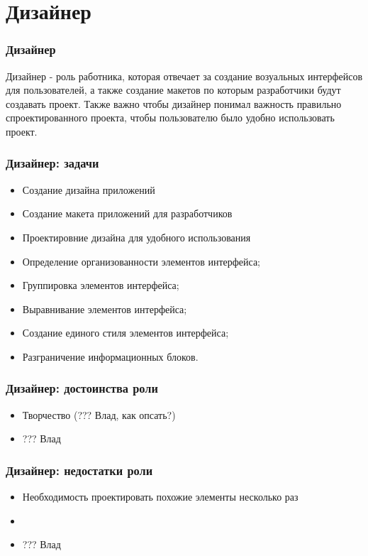 \documentclass{../industrial-development}
\begin{document}
	\section{Дизайнер }
	
	\begin{frame} \frametitle{Дизайнер}
		\begin{block}{}
			\alert {Дизайнер} - роль работника, которая отвечает за создание возуальных интерфейсов для пользователей, а также создание макетов по которым разработчики будут создавать проект. Также важно чтобы дизайнер понимал важность правильно спроектированного проекта, чтобы пользователю было удобно использовать проект.
		\end{block}
		
	\end{frame}
	
	\begin{frame} \frametitle{Дизайнер: задачи}
		\begin{block}{}
			\begin{itemize}
				\item Создание дизайна приложений
				\item Создание макета приложений для разработчиков
				\item Проектировние дизайна для удобного использования
				\item Определение организованности элементов интерфейса;
				\item Группировка элементов интерфейса;
				\item Выравнивание элементов интерфейса;
				\item Создание единого стиля элементов интерфейса;
				\item Разграничение информационных блоков.
			\end{itemize}
		\end{block}
	\end{frame}
	
	\begin{frame} \frametitle{Дизайнер: достоинства роли}
		\begin{block}{}
			\begin{itemize}
				\item Творчество (??? Влад, как опсать?)
				\item  ??? Влад
			\end{itemize}
		\end{block}
	\end{frame}
	
	\begin{frame} \frametitle{Дизайнер: недостатки роли}
		\begin{block}{}
			\begin{itemize}
				\item Необходимость проектировать похожие элементы несколько раз
				\item 
				\item  ??? Влад
			\end{itemize}
		\end{block}
	\end{frame}
	
\end{document}
